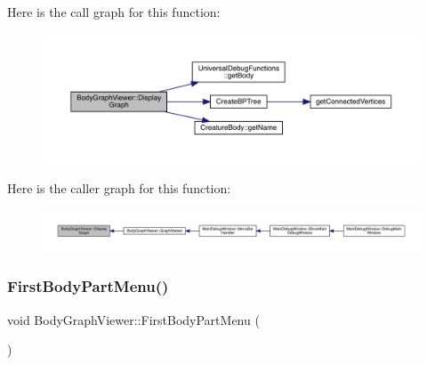 Here is the call graph for this function\+:
\nopagebreak
\begin{figure}[H]
\begin{center}
\leavevmode
\includegraphics[width=350pt]{df/d9e/namespace_body_graph_viewer_a4f4bee772e1d2c1133111866dd88f140_cgraph}
\end{center}
\end{figure}
Here is the caller graph for this function\+:
\nopagebreak
\begin{figure}[H]
\begin{center}
\leavevmode
\includegraphics[width=350pt]{df/d9e/namespace_body_graph_viewer_a4f4bee772e1d2c1133111866dd88f140_icgraph}
\end{center}
\end{figure}
\mbox{\label{namespace_body_graph_viewer_a7a0ddd4c8da17a236fb1b160d43d6c72}} 
\subsubsection{\texorpdfstring{First\+Body\+Part\+Menu()}{FirstBodyPartMenu()}}
{\footnotesize\ttfamily void Body\+Graph\+Viewer\+::\+First\+Body\+Part\+Menu (\begin{DoxyParamCaption}{ }\end{DoxyParamCaption})}

